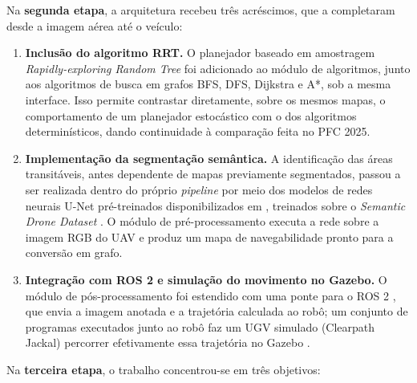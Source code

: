 \documentclass[
    12pt,
    openright,
    oneside,
    a4paper,
    english,
    brazil
]{abntex2}
\begin{document}
Na \textbf{segunda etapa}, a arquitetura recebeu três acréscimos, que a completaram desde a imagem aérea até o veículo:

\begin{enumerate}
    \item \textbf{Inclusão do algoritmo RRT.} O planejador baseado em amostragem \textit{Rapidly-exploring Random Tree} \cite{lavalle1998} foi adicionado ao módulo de algoritmos, junto aos algoritmos de busca em grafos BFS, DFS, Dijkstra e A*, sob a mesma interface. Isso permite contrastar diretamente, sobre os mesmos mapas, o comportamento de um planejador estocástico com o dos algoritmos determinísticos, dando continuidade à comparação feita no PFC 2025.

    \item \textbf{Implementação da segmentação semântica.} A identificação das áreas transitáveis, antes dependente de mapas previamente segmentados, passou a ser realizada dentro do próprio \textit{pipeline} por meio dos modelos de redes neurais U-Net pré-treinados disponibilizados em \cite{junior2024_models}, treinados sobre o \emph{Semantic Drone Dataset} \cite{drone_dataset}. O módulo de pré-processamento executa a rede sobre a imagem RGB do UAV e produz um mapa de navegabilidade pronto para a conversão em grafo.

    \item \textbf{Integração com ROS 2 e simulação do movimento no Gazebo.} O módulo de pós-processamento foi estendido com uma ponte para o ROS 2 \cite{quigley2009}, que envia a imagem anotada e a trajetória calculada ao robô; um conjunto de programas executados junto ao robô faz um UGV simulado (Clearpath Jackal) percorrer efetivamente essa trajetória no Gazebo \cite{koenig2004}.
\end{enumerate}

Na \textbf{terceira etapa}, o trabalho concentrou-se em três objetivos:
\end{document}
